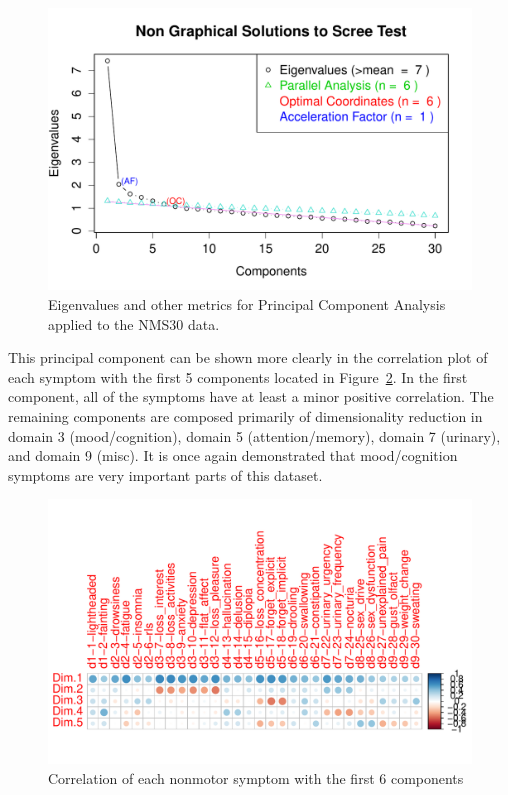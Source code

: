 \documentclass[10pt]{article}
\begin{document}
\begin{multicols}{2}
\begin{figure}[H]
  \centering
  \includegraphics[width=\linewidth]{nms30only-eigs.pdf}
  \caption{Eigenvalues and other metrics for Principal Component Analysis applied to the NMS30 data.}
  \label{fig:nms30only-eigs}
\end{figure}

This principal component can be shown more clearly in the correlation plot of each symptom with the
first 5 components located in Figure~\ref{fig:nms30only-eigscorr}. In the first component, all of the
symptoms have at least a minor positive correlation. The remaining components are composed
primarily of dimensionality reduction in domain 3 (mood/cognition), domain 5 (attention/memory),
domain 7 (urinary), and domain 9 (misc). It is once again demonstrated that mood/cognition symptoms
are very important parts of this dataset.

\begin{figure}[t]
  \centering
  \includegraphics[width=\linewidth]{nms30only-eigscorr.pdf}
  \caption{Correlation of each nonmotor symptom with the first 6 components}
  \label{fig:nms30only-eigscorr}
\end{figure}


\end{multicols}
\end{document}
